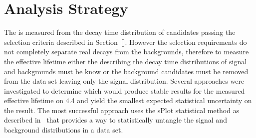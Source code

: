 \section{Analysis Strategy}
\label{sec:fitstrategy}


The \bsmumu \el is measured from the decay time distribution of \bsmumu candidates passing the selection criteria described in Section~\ref{}. However the selection requirements do not completely separate real \bsmumu decays from the backgrounds, therefore to measure the \bsmumu effective lifetime either the \pdfs describing the decay time distributions of signal and backgrounds must be know or the background candidates must be removed from the data set leaving only the signal distribution. Several approaches were investigated to determine which would produce stable results for the measured \bsmumu effective lifetime on 4.4 \fb and yield the smallest expected statistical uncertainty on the result. The most successful approach uses the sPlot statistical method as described in~\cite{Pivk:2004ty} that provides a way to statistically untangle the signal and background distributions in a data set.

